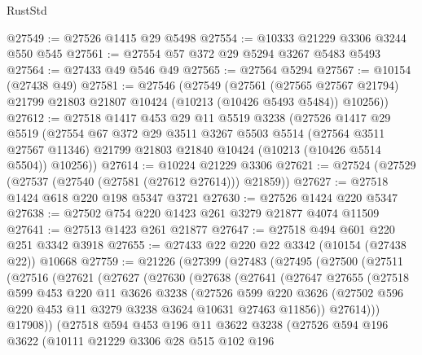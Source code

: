 \begin{lexlean}{RustStd}
\begin{coremodule}
{\begin{coremodule}
{{{{{{{{{{{{{{{{{{{{{{{{{{@27549 := @27526 @1415 @29 @5498
@27554 := @10333 @21229 @3306 @3244 @550 @545
@27561 := @27554 @57 @372 @29 @5294 @3267 @5483 @5493
@27564 := @27433 @49 @546 @49
@27565 := @27564 @5294
@27567 := @10154 (@27438 @49)
@27581 := @27546
    (@27549
      (@27561
        (@27565 @27567 @21794)
        @21799
        @21803
        @21807
        @10424
        (@10213 (@10426 @5493 @5484))
        @10256))
@27612 := @27518
    @1417
    @453
    @29
    @11
    @5519
    @3238
    (@27526
      @1417
      @29
      @5519
      (@27554
        @67
        @372
        @29
        @3511
        @3267
        @5503
        @5514
        (@27564 @3511 @27567 @11346)
        @21799
        @21803
        @21840
        @10424
        (@10213 (@10426 @5514 @5504))
        @10256))
@27614 := @10224 @21229 @3306
@27621 := @27524 (@27529 (@27537 (@27540 (@27581 (@27612 @27614))) @21859))
@27627 := @27518 @1424 @618 @220 @198 @5347 @3721
@27630 := @27526 @1424 @220 @5347
@27638 := @27502 @754 @220 @1423 @261 @3279 @21877 @4074 @11509
@27641 := @27513 @1423 @261 @21877
@27647 := @27518 @494 @601 @220 @251 @3342 @3918
@27655 := @27433 @22 @220 @22 @3342 (@10154 (@27438 @22)) @10668
@27759 := @21226
    (@27399
      (@27483
        (@27495
          (@27500
            (@27511
              (@27516
                (@27621
                  (@27627
                    (@27630
                      (@27638
                        (@27641
                          (@27647
                            @27655
                            (@27518
                              @599
                              @453
                              @220
                              @11
                              @3626
                              @3238
                              (@27526
                                @599
                                @220
                                @3626
                                (@27502 @596 @220 @453 @11 @3279 @3238 @3624 @10631 @27463 @11856))
                              @27614)))
                        @17908))
                    (@27518
                      @594
                      @453
                      @196
                      @11
                      @3622
                      @3238
                      (@27526
                        @594
                        @196
                        @3622
                        (@10111
                          @21229
                          @3306
                          @28
                          @515
                          @102
                          @196
}}}}}}}}}}}}}}}}}}}}}}}}}}
\end{coremodule}}
\end{coremodule}
\end{lexlean}
